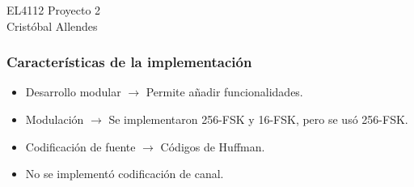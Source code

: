 \documentclass[aspectratio=169]{beamer}
\begin{document}

\begin{frame}

\LARGE EL4112 Proyecto 2 \\
\large Cristóbal Allendes


\end{frame}


\begin{frame}

\frametitle{Características de la implementación}

\begin{itemize}
	\item Desarrollo modular $\rightarrow$ Permite añadir funcionalidades.
	\item Modulación $\rightarrow$ Se implementaron 256-FSK y 16-FSK, pero
	se usó 256-FSK.
	\item Codificación de fuente $\rightarrow$ Códigos de Huffman.
	\item No se implementó codificación de canal.
\end{itemize}

\end{frame}

\end{document}

